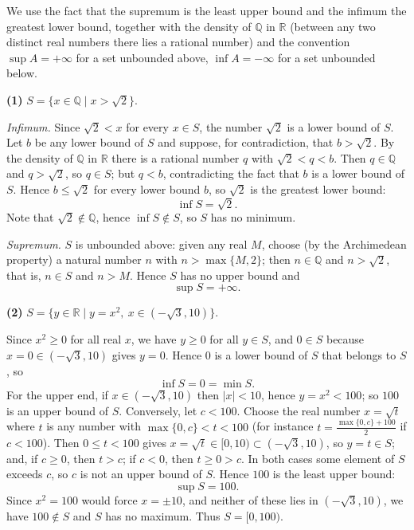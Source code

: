 \documentclass[11pt,a4paper]{article}
\newenvironment{solution}[1]{%
  \par\addvspace{1.7ex}%
  \noindent{\color{solutioncolor}\textbf{#1}}\hspace{0.55em}\ignorespaces}%
  {\par\addvspace{0.9ex}}
\begin{document}
\begin{solution}{Solution 2.4.4}\label{xs:2.4.4}
We use the fact that the supremum is the least upper bound and the infimum the greatest lower bound, together with the density of $\mathbb{Q}$ in $\mathbb{R}$ (between any two distinct real numbers there lies a rational number) and the convention $\sup A = +\infty$ for a set unbounded above, $\inf A = -\infty$ for a set unbounded below.

\medskip
\noindent\textbf{(1)} $S = \{x \in \mathbb{Q} \mid x > \sqrt{2}\}$.

\emph{Infimum.} Since $\sqrt{2} < x$ for every $x \in S$, the number $\sqrt{2}$ is a lower bound of $S$. Let $b$ be any lower bound of $S$ and suppose, for contradiction, that $b > \sqrt{2}$. By the density of $\mathbb{Q}$ in $\mathbb{R}$ there is a rational number $q$ with $\sqrt{2} < q < b$. Then $q \in \mathbb{Q}$ and $q > \sqrt{2}$, so $q \in S$; but $q < b$, contradicting the fact that $b$ is a lower bound of $S$. Hence $b \le \sqrt{2}$ for every lower bound $b$, so $\sqrt{2}$ is the greatest lower bound:
\[
\inf S = \sqrt{2}.
\]
Note that $\sqrt{2} \notin \mathbb{Q}$, hence $\inf S \notin S$, so $S$ has no minimum.

\emph{Supremum.} $S$ is unbounded above: given any real $M$, choose (by the Archimedean property) a natural number $n$ with $n > \max\{M, 2\}$; then $n \in \mathbb{Q}$ and $n > \sqrt{2}$, that is, $n \in S$ and $n > M$. Hence $S$ has no upper bound and
\[
\sup S = +\infty .
\]

\medskip
\noindent\textbf{(2)} $S = \{y \in \mathbb{R} \mid y = x^2,\ x \in (-\sqrt{3}, 10)\}$.

Since $x^2 \ge 0$ for all real $x$, we have $y \ge 0$ for all $y \in S$, and $0 \in S$ because $x = 0 \in (-\sqrt{3}, 10)$ gives $y = 0$. Hence $0$ is a lower bound of $S$ that belongs to $S$, so
\[
\inf S = 0 = \min S .
\]
For the upper end, if $x \in (-\sqrt{3}, 10)$ then $|x| < 10$, hence $y = x^2 < 100$; so $100$ is an upper bound of $S$. Conversely, let $c < 100$. Choose the real number $x = \sqrt{t}$ where $t$ is any number with $\max\{0, c\} < t < 100$ (for instance $t = \frac{\max\{0,c\} + 100}{2}$ if $c < 100$). Then $0 \le t < 100$ gives $x = \sqrt{t} \in [0, 10) \subset (-\sqrt{3}, 10)$, so $y = t \in S$; and, if $c \ge 0$, then $t > c$; if $c < 0$, then $t \ge 0 > c$. In both cases some element of $S$ exceeds $c$, so $c$ is not an upper bound of $S$. Hence $100$ is the least upper bound:
\[
\sup S = 100 .
\]
Since $x^2 = 100$ would force $x = \pm 10$, and neither of these lies in $(-\sqrt{3}, 10)$, we have $100 \notin S$ and $S$ has no maximum. Thus $S = [0, 100)$.


\end{solution}
\end{document}
